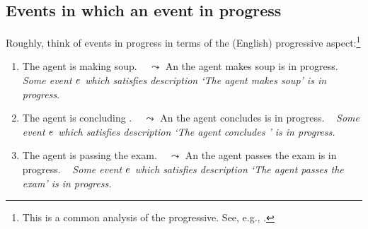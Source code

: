 \documentclass[10pt]{article}
\begin{document}
\subsection{Events in which an event in progress}
\label{sec:events-progress}

\begin{note}
  \hfill\hspace{\dimexpr-\fboxrule-\fboxsep\relax}\hfill
\end{note}

\begin{note}
  Roughly, think of events in progress in terms of the (English) progressive aspect:\footnote{
    This is a common analysis of the progressive.
    See, e.g., \cite{Bennett:1972uw,Dowty:1979vq,Parsons:1990aa,Landman:1992wh,Portner:1998um}.
  }
  \begin{enumerate}
  \item
    The agent is making soup.%
    \mbox{ } \hfill \(\leadsto\) An  the agent makes soup is in progress.\newline
    \mbox{ }\hfill \emph{{\color{gray} Some event \(e\sb{}\) which satisfies description} {\color{darkgray} `The agent makes soup'} {\color{gray} is in progress}}.
  \item
    The agent is concluding \rootsCon{}.%
    \mbox{ } \hfill \(\leadsto\) An  the agent concludes \rootsCon{} is in progress.\newline
    \mbox{ }\hfill \emph{{\color{gray} Some event \(e\sb{}\) which satisfies description} {\color{darkgray} `The agent concludes \rootsCon{}' } {\color{gray} is in progress}.}
  \item
    The agent is passing the exam.%
    \mbox{ } \hfill \(\leadsto\) An  the agent passes the exam is in progress.\newline
    \mbox{ }\hfill \emph{{\color{gray} Some event \(e\sb{}\) which satisfies description} {\color{darkgray} `The agent passes the exam'} {\color{gray} is in progress}.}
  \end{enumerate}
\begin{comment}
  This doesn't quite work, as the progressive has some quirks.
  Still, it's close enough to fix a grasp on events in progress.
\end{comment}
\end{note}
\end{document}
